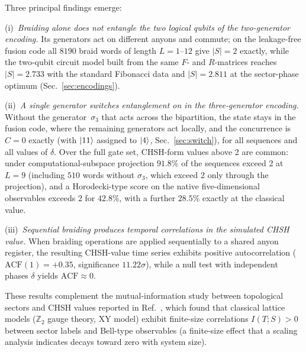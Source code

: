 \documentclass[aps,pra,twocolumn,superscriptaddress,longbibliography,floatfix,nofootinbib]{revtex4-2}
\begin{document}
Three principal findings emerge:

(i)~\emph{Braiding alone does not entangle the two logical qubits of the
two-generator encoding.} Its generators act on different anyons and
commute; on the leakage-free fusion code all $8190$ braid words of
length $L=1$--$12$ give $|S| = 2$ exactly, while the two-qubit circuit
model built from the same $F$- and $R$-matrices reaches $|S| = 2.733$
with the standard Fibonacci data and $|S| = 2.811$ at the sector-phase
optimum (Sec.~\ref{sec:encodings}).

(ii)~\emph{A single generator switches entanglement on in the
three-generator encoding.} Without the generator~$\sigma_3$ that acts
across the bipartition, the state stays in the fusion code, where the
remaining generators act locally, and the concurrence is $C=0$ exactly
(with $\ket{11}$ assigned to $\ket{4}$, Sec.~\ref{sec:switch}), for all
sequences and all values of $\delta$. Over the full gate set, CHSH-form
values above 2 are common: under computational-subspace projection
$91.8\%$ of the sequences exceed 2 at $L=9$ (including $510$ words
without $\sigma_3$, which exceed 2 only through the projection), and a
Horodecki-type score on the native five-dimensional observables exceeds
2 for $42.8\%$, with a further $28.5\%$ exactly at the classical value.

(iii)~\emph{Sequential braiding produces temporal correlations in the
simulated CHSH value.} When braiding operations are applied sequentially
to a shared anyon register, the resulting CHSH-value time series
exhibits positive autocorrelation ($\text{ACF}(1)=+0.35$, significance
$11.22\sigma$), while a null test with independent phases $\delta$
yields $\text{ACF}\approx 0$.

These results complement the mutual-information study
between topological sectors and CHSH values reported in
Ref.~\cite{Sayim2026topological}, which found that classical lattice
models ($\mathbb{Z}_2$ gauge theory, XY model) exhibit
finite-size correlations $I(T;S)>0$ between sector labels and
Bell-type observables (a finite-size effect that a scaling analysis
indicates decays toward zero with system size).
\end{document}
